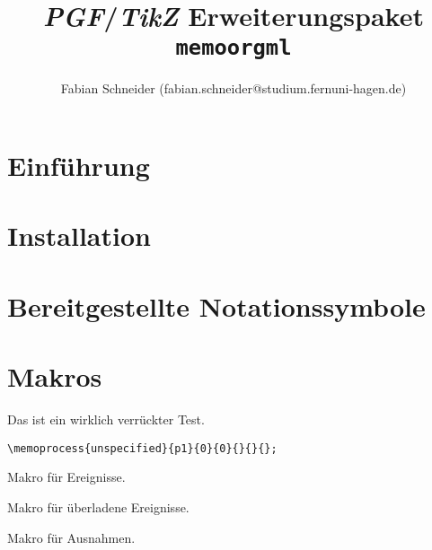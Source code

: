 \documentclass[11pt]{article}
\begin{document}
\begin{titlepage}
\title{\textit{PGF}/\textit{TikZ} Erweiterungspaket \texttt{memoorgml}} 
\author{Fabian Schneider (fabian.schneider@studium.fernuni-hagen.de)}   
\end{titlepage}
\maketitle

\section{Einführung}
\label{sec:Einführung}

\section{Installation}
\label{sec:Installation}

\section{Bereitgestellte Notationssymbole}
\label{sec:Notationssymbole}

\section{Makros}
\label{sec:Makros}
\DescribeMacro{\memoprocess} \medskip

Das ist ein wirklich verrückter Test.

    \begin{lstlisting}
\memoprocess{unspecified}{p1}{0}{0}{}{}{};    
    \end{lstlisting}\bigskip

\DescribeMacro{\memoevent}\medskip

Makro für Ereignisse.\bigskip

\DescribeMacro{\memoeventloaded}\medskip

Makro für überladene Ereignisse.\bigskip

\DescribeMacro{\memoexception}\medskip

 Makro für Ausnahmen.\bigskip

\DescribeMacro{\memoconn}\medskip
\end{document}
